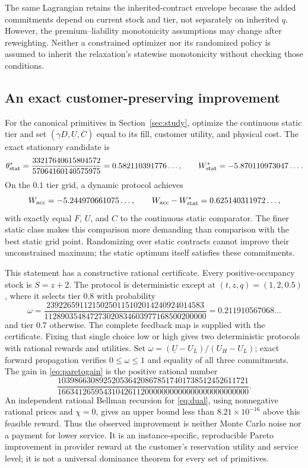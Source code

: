 \documentclass[11pt,letterpaper]{article}
\theoremstyle{definition}
\newcommand{\1}{\mathbf 1}
\begin{document}
The same Lagrangian retains the inherited-contract envelope because the added commitments depend on current stock and tier, not separately on inherited $q$. However, the premium--liability monotonicity assumptions may change after reweighting. Neither a constrained optimizer nor its randomized policy is assumed to inherit the relaxation's statewise monotonicity without checking those conditions.

\subsection{An exact customer-preserving improvement}\label{sec:pareto}
For the canonical primitives in Section~\ref{sec:study}, optimize the continuous static tier and set $(\gamma D,\underline U,\overline C)$ equal to its fill, customer utility, and physical cost. The exact stationary candidate is
\[
 \theta^*_{\rm stat}=\frac{33217640615804572}{57064160140575975}
   =0.582110391776\ldots,
 \qquad W^*_{\rm stat}=-5.870110973047\ldots.
\]
On the $0.1$ tier grid, a dynamic protocol achieves
\begin{equation}\label{eq:paretogain}
 W_{\rm acc}=-5.244970661075\ldots,
 \qquad W_{\rm acc}-W^*_{\rm stat}=0.625140311972\ldots,
\end{equation}
with exactly equal $F$, $U$, and $C$ to the continuous static comparator. The finer static class makes this comparison more demanding than comparison with the best static grid point. Randomizing over static contracts cannot improve their unconstrained maximum; the static optimum itself satisfies these commitments.

This statement has a constructive rational certificate. Every positive-occupancy stock is $S=z+2$. The protocol is deterministic except at $(t,z,q)=(1,2,0.5)$, where it selects tier $0.8$ with probability
\[
 \omega=
 \frac{23922659112150250115102014240924014583}
 {112890354847273020834603977168500200000}
 =0.211910567068\ldots
\]
and tier $0.7$ otherwise. The complete feedback map is supplied with the certificate. Fixing that single choice low or high gives two deterministic protocols with rational rewards and utilities. Set $\omega=(\underline U-U_L)/(U_H-U_L)$; exact forward propagation verifies $0\leq\omega\leq1$ and equality of all three commitments. The gain in \eqref{eq:paretogain} is the positive rational number
\[
 \frac{1039866308925205364208678517401738512452611721}
 {1663412659543104261120000000000000000000000000}.
\]
An independent rational Bellman recursion for \eqref{eq:dual}, using nonnegative rational prices and $\chi=0$, gives an upper bound less than $8.21\times10^{-16}$ above this feasible reward. Thus the observed improvement is neither Monte Carlo noise nor a payment for lower service. It is an instance-specific, reproducible Pareto improvement in provider reward at the customer's reservation utility and service level; it is not a universal dominance theorem for every set of primitives.
\end{document}
